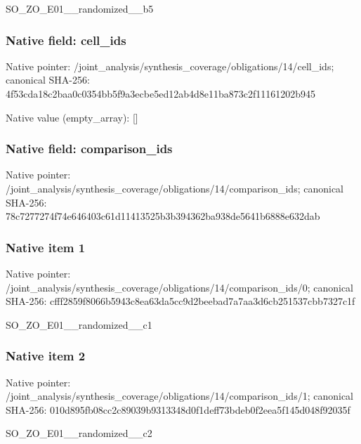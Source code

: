 \documentclass[10pt,a4paper]{article}
\begin{document}
\begingroup\raggedright\sloppy SO\_\allowbreak{}ZO\_\allowbreak{}E01\_\allowbreak{}\_\allowbreak{}randomized\_\allowbreak{}\_\allowbreak{}b5\par\endgroup

\subsubsection{Native field: cell\_\allowbreak{}ids}
Native pointer: /joint\_\allowbreak{}analysis/synthesis\_\allowbreak{}coverage/obligations/14/cell\_\allowbreak{}ids; canonical SHA-256: 4f53cda18c2baa0c0354bb5f9a3ecbe5ed12ab4d8e11ba873c2f11161202b945

Native value (empty\_\allowbreak{}array): []

\subsubsection{Native field: comparison\_\allowbreak{}ids}
Native pointer: /joint\_\allowbreak{}analysis/synthesis\_\allowbreak{}coverage/obligations/14/comparison\_\allowbreak{}ids; canonical SHA-256: 78c7277274f74e646403c61d11413525b3b394362ba938de5641b6888e632dab

\subsubsection{Native item 1}
Native pointer: /joint\_\allowbreak{}analysis/synthesis\_\allowbreak{}coverage/obligations/14/comparison\_\allowbreak{}ids/0; canonical SHA-256: cfff2859f8066b5943c8ea63da5cc9d2beebad7a7aa3d6cb251537cbb7327c1f

\begingroup\raggedright\sloppy SO\_\allowbreak{}ZO\_\allowbreak{}E01\_\allowbreak{}\_\allowbreak{}randomized\_\allowbreak{}\_\allowbreak{}c1\par\endgroup

\subsubsection{Native item 2}
Native pointer: /joint\_\allowbreak{}analysis/synthesis\_\allowbreak{}coverage/obligations/14/comparison\_\allowbreak{}ids/1; canonical SHA-256: 010d895fb08cc2c89039b9313348d0f1deff73bdeb0f2eea5f145d048f92035f

\begingroup\raggedright\sloppy SO\_\allowbreak{}ZO\_\allowbreak{}E01\_\allowbreak{}\_\allowbreak{}randomized\_\allowbreak{}\_\allowbreak{}c2\par\endgroup
\end{document}
